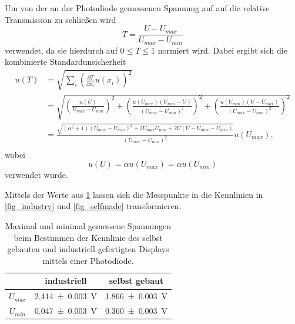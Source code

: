 \documentclass[
	a4paper,
	12pt,
	pagesize,
	ngerman
]{scrartcl}
\begin{document}
	Um von der an der Photodiode gemessenen Spannung auf auf die relative Transmission zu schließen wird
	\begin{equation}
			T = \frac{U-U_{max}}{U_{max}-U_{min}}
	\end{equation}
	verwendet, da sie hierdurch auf $0\leq T \leq 1$ normiert wird. Dabei ergibt sich die kombinierte Standardunsicherheit
	\begin{align*}
		u(T) &= \sqrt{\sum_{i}\left(\frac{\partial T}{\partial x_i} u(x_i)\right)^2}\\
		&= \sqrt{\left(\frac{u(U)}{U_{max}-U_{min}}\right)^2+\left(\frac{u(U_{max})(U_{min}-U)}{(U_{max}-U_{min})^2}\right)^2+\left(\frac{u(U_{min})(U-U_{max})}{(U_{max}-U_{min})^2}\right)^2} \\
		&=	\frac{\sqrt{ (\alpha^2+1) (U_{max}-U_{min})^2+2U_{max}U_{min}+2U(U-U_{max}-U_{min})}}{(U_{max}-U_{min})^2} u(U_{max}), \\
	\end{align*}
	wobei
	\begin{equation*}
			u(U)=\alpha u(U_{max})=\alpha u(U_{min})
	\end{equation*}
	verwendet wurde.

	Mittels der Werte aus \cref{tb_maxmin} lassen sich die Messpunkte in die Kennlinien in \cref{fig_industry} und \cref{fig_selfmade} transformieren.
\begin{table}[H]
		\centering
		\begin{tabular}{ c | c | c }
			 & industriell & selbst gebaut \\ \hline
			$U_{max}$ & \SI{2.414+-0.003}{V} & \SI{1.866+-0.003}{V} \\
			$U_{min}$ & \SI{0.047+-0.003}{V} & \SI{0.360+-0.003}{V} \\
		\end{tabular}
		\caption{Maximal und minimal gemessene Spannungen beim Bestimmen der Kennlinie des selbst gebauten und industriell gefertigten Displays mittels einer Photodiode.}
		\label{tb_maxmin}
\end{table}
\end{document}
